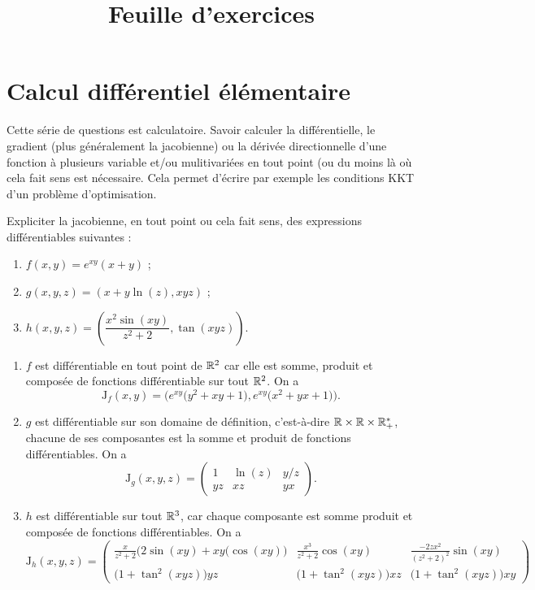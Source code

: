 \documentclass[11pt, a4paper]{article}
\title{%
  { \huge Feuille d'exercices}%
}
\author{}
\date{}
\begin{document}
\maketitle\thispagestyle{fancy}

\section{Calcul différentiel élémentaire}

Cette série de questions est calculatoire. Savoir calculer la
différentielle, le gradient (plus généralement la jacobienne) ou la
dérivée directionnelle d'une fonction à plusieurs variable et/ou
mulitivariées en tout point (ou du moins là où cela fait sens est
nécessaire. Cela permet d'écrire par exemple les conditions KKT d'un
problème d'optimisation.

\begin{question}
  Expliciter la jacobienne, en tout point ou cela fait sens, des
  expressions différentiables suivantes :
  \begin{enumerate}
  \item $f(x, y) = e^{xy}(x+y)$ ;
  \item $g(x, y, z) = (x + y\ln(z), xyz)$ ;
  \item $h(x, y, z) = \left(\dfrac{x^2\sin(xy)}{z^2 + 2}, \tan(xyz)\right)$.
  \end{enumerate}
\end{question}
\begin{solution}
  \begin{enumerate}
  \item $f$ est différentiable en tout point de $\mathbb{R}^2$ car elle est
    somme, produit et composée de fonctions différentiable sur tout
    $\mathbb{R}^2$. On a
    \[
    \mathrm{J}_f(x, y) = \Big(e^{xy}\big(y^2+ xy + 1\big), e^{xy}\big(x^2+ yx + 1\big)\Big).
    \]
  \item $g$ est différentiable sur son domaine de définition,
    c'est-à-dire $\mathbb{R}\times \mathbb{R}\times \mathbb{R}_+^*$, chacune de ses
    composantes est la somme et produit de fonctions
    différentiables. On a
    \[
    \mathrm{J}_g(x, y, z) = \begin{pmatrix} 1 & \ln(z) & y/z \\ yz & xz & yx \end{pmatrix}.
    \]
  \item $h$ est différentiable sur tout $\mathbb{R}^3$, car chaque composante
    est somme produit et composée de fonctions différentiables. On a
    \[
    \mathrm{J}_h(x, y, z) =
    \begin{pmatrix}
      \frac{x}{z^2 + 2}\big(2\sin(xy) + xy(\cos(xy)\big)
      & \frac{x^3}{z^2+2}\cos(xy)
      & \frac{-2zx^2}{(z^2+2)^2}\sin(xy) \\
      \big(1+\tan^2(xyz)\big)yz
      & \big(1+\tan^2(xyz)\big)xz
      & \big(1+\tan^2(xyz)\big)xy
    \end{pmatrix}
    \]
  \end{enumerate}
\end{solution}
\end{document}
